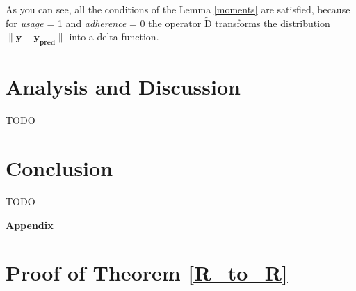 \documentclass{article}
\begin{document}
        As you can see, all the conditions of the Lemma \ref{moments} are satisfied, because for \textit{usage} = 1 and \textit{adherence} = 0 the operator $\widetilde{\text{D}}$ transforms the distribution $\|\mathbf{y} - \mathbf{y_{\text{pred}}}\|$ into a delta function.


    \section{Analysis and Discussion}
        TODO

    \section{Conclusion}
        TODO

    
\newpage


  

\newpage

\begin{center}
    \LARGE \textbf{Appendix}
\end{center}
\normalsize

\appendix

    \section{Proof of Theorem \ref{R_to_R}} \label{pr_R_to_R}
\end{document}
